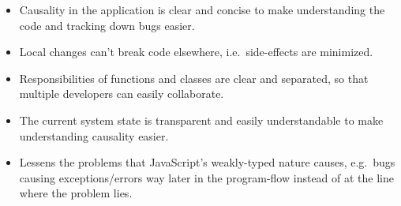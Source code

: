 \begin{itemize}
\item
  Causality in the application is clear and concise to make
  understanding the code and tracking down bugs easier.
\item
  Local changes can't break code elsewhere, i.e.~side-effects are
  minimized.
\item
  Responsibilities of functions and classes are clear and separated, so
  that multiple developers can easily collaborate.
\item
  The current system state is transparent and easily understandable to
  make understanding causality easier.
\item
  Lessens the problems that JavaScript's weakly-typed nature causes,
  e.g.~bugs causing exceptions/errors way later in the program-flow
  instead of at the line where the problem lies.
\end{itemize}

